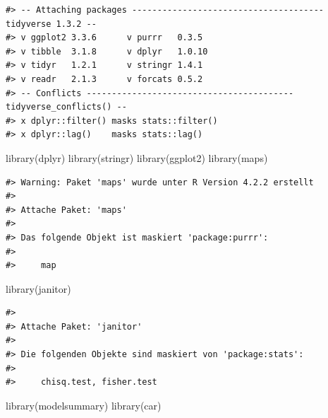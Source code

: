 \documentclass[
  11pt,
  a4paper,
  twoside]{scrbook}
\newenvironment{Shaded}{\begin{snugshade}}{\end{snugshade}}
\newcommand{\FunctionTok}[1]{\textcolor[rgb]{0.00,0.00,0.00}{#1}}
\newcommand{\NormalTok}[1]{#1}
\begin{document}
\linespread{1}

\begin{verbatim}
#> -- Attaching packages -------------------------------------- tidyverse 1.3.2 --
#> v ggplot2 3.3.6      v purrr   0.3.5 
#> v tibble  3.1.8      v dplyr   1.0.10
#> v tidyr   1.2.1      v stringr 1.4.1 
#> v readr   2.1.3      v forcats 0.5.2 
#> -- Conflicts ----------------------------------------- tidyverse_conflicts() --
#> x dplyr::filter() masks stats::filter()
#> x dplyr::lag()    masks stats::lag()
\end{verbatim}

\linespread{1}

\begin{Shaded}
\begin{Highlighting}[]
\FunctionTok{library}\NormalTok{(dplyr)}
\FunctionTok{library}\NormalTok{(stringr)}
\FunctionTok{library}\NormalTok{(ggplot2)}
\FunctionTok{library}\NormalTok{(maps)}
\end{Highlighting}
\end{Shaded}

\linespread{1}

\begin{verbatim}
#> Warning: Paket 'maps' wurde unter R Version 4.2.2 erstellt
#> 
#> Attache Paket: 'maps'
#> 
#> Das folgende Objekt ist maskiert 'package:purrr':
#> 
#>     map
\end{verbatim}

\linespread{1}

\begin{Shaded}
\begin{Highlighting}[]
\FunctionTok{library}\NormalTok{(janitor)}
\end{Highlighting}
\end{Shaded}

\linespread{1}

\begin{verbatim}
#> 
#> Attache Paket: 'janitor'
#> 
#> Die folgenden Objekte sind maskiert von 'package:stats':
#> 
#>     chisq.test, fisher.test
\end{verbatim}

\linespread{1}

\begin{Shaded}
\begin{Highlighting}[]
\FunctionTok{library}\NormalTok{(modelsummary)}
\FunctionTok{library}\NormalTok{(car)}
\end{Highlighting}
\end{Shaded}
\end{document}
